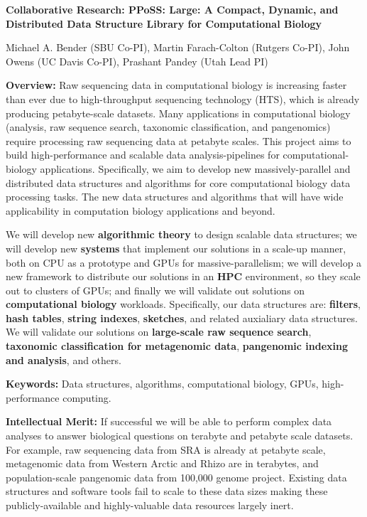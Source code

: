 
\begin{center}
\bf
\Large
Collaborative Research: PPoSS: Large: A Compact, Dynamic, and Distributed Data
Structure Library for Computational Biology

\medskip
\small
Michael A. Bender (SBU Co-PI), Martin Farach-Colton (Rutgers Co-PI), John Owens (UC Davis Co-PI),
Prashant Pandey (Utah Lead PI)
\end{center}


\noindent \textbf{\large Overview:}
Raw sequencing data in computational biology is increasing faster than ever due to high-throughput sequencing technology (HTS), which is already producing petabyte-scale datasets. Many applications in computational biology (\kmer analysis, raw sequence search, taxonomic classification, and pangenomics) require processing raw sequencing data at petabyte scales. This project aims to build high-performance and scalable data analysis-pipelines for computational-biology applications. Specifically, we aim to develop new massively-parallel and distributed data structures and algorithms for core computational biology data processing tasks. The new data structures and algorithms that will have wide applicability in computation biology applications and beyond. 

We will develop new \textbf{algorithmic theory} to design scalable data structures; we will develop new \textbf{systems} that implement our solutions in a scale-up manner,  both on CPU as a prototype and GPUs for massive-parallelism; we will develop a new framework to distribute our solutions in an \textbf{HPC} environment, so they  scale out to clusters of GPUs; and finally we will validate out solutions on \textbf{computational biology} workloads.
%
Specifically, our data structures are: \textbf{filters}, \textbf{hash tables}, \textbf{string indexes}, \textbf{sketches}, and related auxialiary data structures.  We will validate our solutions on \textbf{large-scale raw sequence search}, \textbf{taxonomic classification for metagenomic data}, \textbf{pangenomic indexing and analysis}, and others.


\noindent \textbf{\large Keywords:} Data structures, algorithms, computational biology, GPUs, high-performance computing.

\noindent \textbf{\large Intellectual Merit:}
If successful we will be able to perform complex data analyses to answer biological questions on terabyte and petabyte scale datasets. For example, raw sequencing data from SRA is already at petabyte scale, metagenomic data from Western Arctic and Rhizo are in terabytes, and population-scale pangenomic data from 100,000 genome project. Existing data structures and software tools fail to scale to these data sizes making these publicly-available and highly-valuable data resources largely inert.

